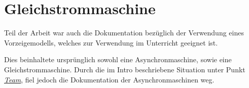 \chapter{Gleichstrommaschine}

Teil der Arbeit war auch die Dokumentation bezüglich der Verwendung eines Vorzeigemodells, welches zur Verwendung im Unterricht geeignet ist.

Dies beinhaltete ursprünglich sowohl eine Asynchronmaschine, sowie eine Gleichstrommaschine.
Durch die im Intro beschriebene Situation unter Punkt \hyperref[team]{\textit{Team}}, fiel jedoch die Dokumentation der Asynchronmaschinen weg.